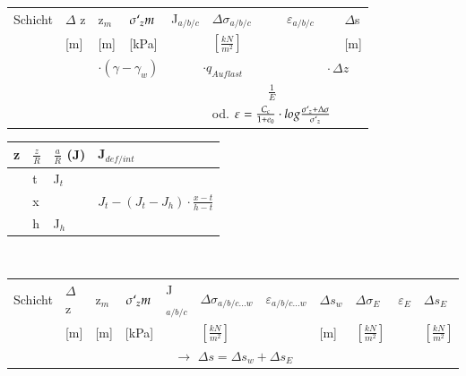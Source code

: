\begin{minipage}{0.7\linewidth}
	\begin{tabular}{|l|l|l|l|l|l|l|l|}
		\hline
		Schicht	& $\Delta$ z	& z$_m$		& $\sigma`_zm$	& J$_{a/b/c}$	& $\Delta \sigma_{a/b/c}$ 	& $\varepsilon_{a/b/c}$ 	& $\Delta$s \\
		& [m]			& [m]		&  [kPa]		& 				& $\left[\frac{kN}{m^2}\right]$ &		& [m] \\ \hline
		
		&		& \multicolumn{2}{c|}{$\cdot (\gamma - \gamma_w)$} &		\multicolumn{2}{c|}{$\cdot q_{Auflast}$} & \multicolumn{2}{c|}{$\qquad \cdot \Delta z$} \\
		&	&	&	&	& \multicolumn{2}{c|}{$\frac{1}{E}$} & \\
		&	&	&	&	&\multicolumn{2}{c|}{ od. $\varepsilon=\frac{C_c}{1 + e_0} \cdot log \frac{\sigma`_z + \Delta \sigma}{\sigma`_z}$} & \\ \hline 	
	\end{tabular}
	\vspace{\baselineskip}
\end{minipage}	
\begin{minipage}{0.4\linewidth}
		\begin{tabular}{l|l|l|l}
			\hline
			z	&	$\frac{z}{R}$	&	$\frac{a}{R}$ (J)	&	J$_{def/int}$	\\ \hline
				& \qquad	t		&	J$_t$				&	\\
				&	x				&						& $J_t - (J_t - J_h) \cdot \frac{x - t}{h - t}$	\\
				& \qquad	h		&	J$_h$				&	\\
		\end{tabular}
		\vspace{\baselineskip} \\
\end{minipage}



	\begin{minipage}{\linewidth}
	\begin{tabular}{|l|l|l|l|l|l|l|l|l|l|l|}
		\hline
		Schicht	& $\Delta$ z	& z$_m$		& $\sigma`_zm$	& J$_{a/b/c}$	& $\Delta \sigma_{a/b/c...w}$ 	& $\varepsilon_{a/b/c...w}$ 	& $\Delta s_w$ & $\Delta \sigma_E$ & $\varepsilon_E$ & $\Delta s_E$	\\
		& [m]			& [m]		&  [kPa]		& 				& $\left[\frac{kN}{m^2}\right]$ &		& [m] 	& $\left[\frac{kN}{m^2}\right]$ &		 & $\left[\frac{kN}{m^2}\right]$ \\ \hline
		\multicolumn{11}{|c|}{$\rightarrow$ $\Delta s = \Delta s_w + \Delta s_E$} \\
	\end{tabular}
	
	\vspace{\baselineskip}
	\end{minipage}


